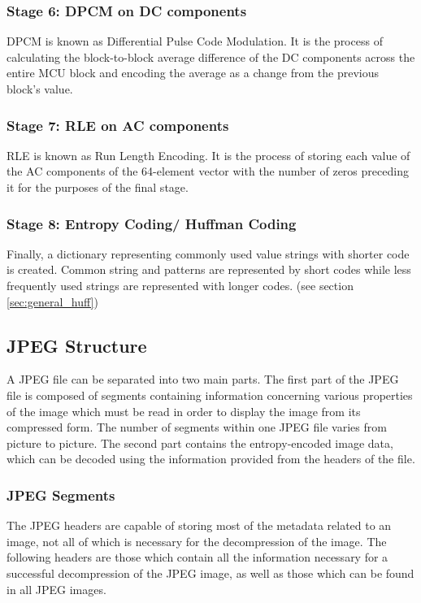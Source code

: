 \subsubsection{Stage 6: DPCM on DC components}
DPCM is known as Differential Pulse
Code Modulation. It is the process of
calculating the block-to-block average difference
of the DC components across the entire MCU block
and encoding the average as a change from the 
previous block's value\cite{hass_impulse_jpeg}.

\subsubsection{Stage 7: RLE on AC components}
RLE is known as Run Length Encoding. It is the process of
storing each value of the AC components of the
64-element vector with the number of zeros
preceding it for the purposes of the final stage\cite{hass_impulse_jpeg}.

\subsubsection{Stage 8: Entropy Coding/ Huffman Coding}
Finally, a dictionary representing commonly used value strings with
shorter code is created. Common string and patterns
are represented by short codes while less frequently
used strings are represented with longer codes.
(see section \ref{sec:general_huff})

\subsection{JPEG Structure}
A JPEG file can be separated into two main parts. 
The first part of the JPEG file is composed of segments containing information concerning 
various properties of the image which must be read in order to display the image from its compressed form. 
The number of segments within one JPEG file varies from picture to picture.
The second part contains the entropy-encoded image data, which can be decoded using the information provided from the headers of the file.  

\subsubsection{JPEG Segments}
The JPEG headers are capable of storing most of the metadata related to an image, not all of which is necessary for the decompression of the image. 
The following headers are those which contain all the information necessary for 
a successful decompression of the JPEG image, as well as those which can be found in all JPEG images.

